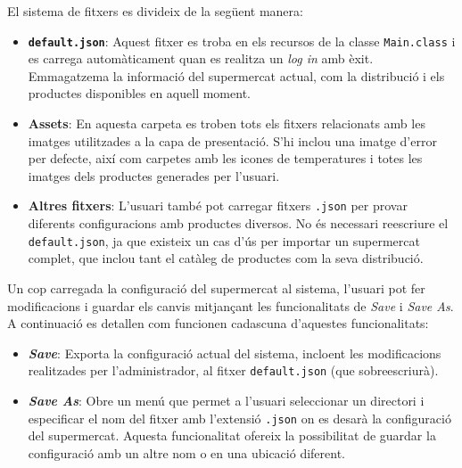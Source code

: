 \documentclass[a4paper,12pt]{report}
\begin{document}
\begin{itemize}
El sistema de fitxers es divideix de la següent manera:

\begin{itemize}
    \item \textbf{\texttt{default.json}}: Aquest fitxer es troba en els recursos de la classe \texttt{Main.class} i es carrega automàticament quan es realitza un \textit{log in} amb èxit. Emmagatzema la informació del supermercat actual, com la distribució i els productes disponibles en aquell moment.
    \item \textbf{Assets}: En aquesta carpeta es troben tots els fitxers relacionats amb les imatges utilitzades a la capa de presentació. S'hi inclou una imatge d'error per defecte, així com carpetes amb les icones de temperatures i totes les imatges dels productes generades per l'usuari.
    \item \textbf{Altres fitxers}: L'usuari també pot carregar fitxers \texttt{.json} per provar diferents configuracions amb productes diversos. No és necessari reescriure el \texttt{default.json}, ja que existeix un cas d'ús per importar un supermercat complet, que inclou tant el catàleg de productes com la seva distribució.
\end{itemize}

Un cop carregada la configuració del supermercat al sistema, l'usuari pot fer modificacions i guardar els canvis mitjançant les funcionalitats de \textit{Save} i \textit{Save As}. A continuació es detallen com funcionen cadascuna d'aquestes funcionalitats:

\begin{itemize}
    \item \textbf{\textit{Save}}: Exporta la configuració actual del sistema, incloent les modificacions realitzades per l'administrador, al fitxer \texttt{default.json} (que sobreescriurà).
    \item \textbf{\textit{Save As}}: Obre un menú que permet a l'usuari seleccionar un directori i especificar el nom del fitxer amb l'extensió \texttt{.json} on es desarà la configuració del supermercat. Aquesta funcionalitat ofereix la possibilitat de guardar la configuració amb un altre nom o en una ubicació diferent.
\end{itemize}

\end{itemize}
\end{document}
